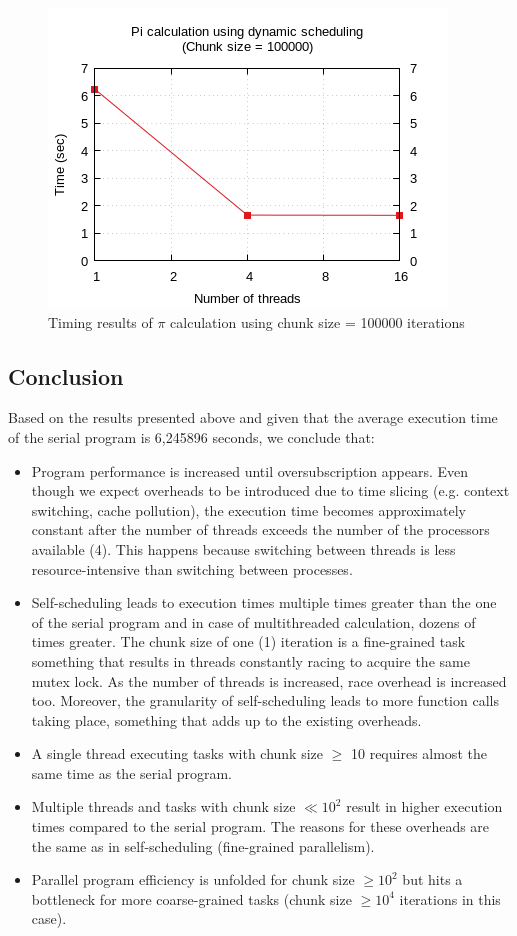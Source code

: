 \documentclass{article}
\begin{document}
\begin{figure}[htbp]
  \centering
  \includegraphics[width=0.55\columnwidth]{../ex1/plots/pi_c100000.png}
  \caption{Timing results of $\pi$ calculation using chunk size = 100000 iterations}
\end{figure}

\pagebreak

\subsection{Conclusion}
Based on the results presented above and given that the average execution time of the serial
program is 6,245896 seconds, we conclude that:

\begin{itemize}
 \item Program performance is increased until oversubscription appears. Even though we expect
       overheads to be introduced due to time slicing (e.g. context switching, cache pollution),
       the execution time becomes approximately constant after the number of threads exceeds
       the number of the processors available (4). This happens because switching between
       threads is less resource-intensive than switching between processes.
 \item Self-scheduling leads to execution times multiple times greater than the one of the
       serial program and in case of multithreaded calculation, dozens of times greater.
       The chunk size of one (1) iteration is a fine-grained task something that results
       in threads constantly racing to acquire the same mutex lock. As the number of threads
       is increased, race overhead is increased too. Moreover, the granularity of self-scheduling
       leads to more function calls taking place, something that adds up to the existing overheads.
 \item A single thread executing tasks with chunk size $\geq$ 10 requires almost the same time
       as the serial program.
 \item Multiple threads and tasks with chunk size $\ll 10^2$ result in higher execution times
       compared to the serial program. The reasons for these overheads are the same as in
       self-scheduling (fine-grained parallelism).
 \item Parallel program efficiency is unfolded for chunk size $\geq 10^2$ but hits a bottleneck
       for more coarse-grained tasks (chunk size $\geq 10^4$ iterations in this case).
\end{itemize}
\end{document}
